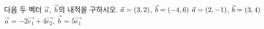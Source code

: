 다음 두 벡터 $\vec{a}$, $\vec{b}$의 내적을 구하시오.
 $\vec{a}=(3{,}\mkern3mu\mathopen{}2)$, $\vec{b}=(-4{,}\mkern3mu\mathopen{}6)$
 $\vec{a}=(2{,}\mkern3mu\mathopen{}-1)$, $\vec{b}=(3{,}\mkern3mu\mathopen{}4)$
 $\vec{a}=-2\vec{e_1}+4\vec{e_2}$, $\vec{b}=5\vec{e_1}$ 
